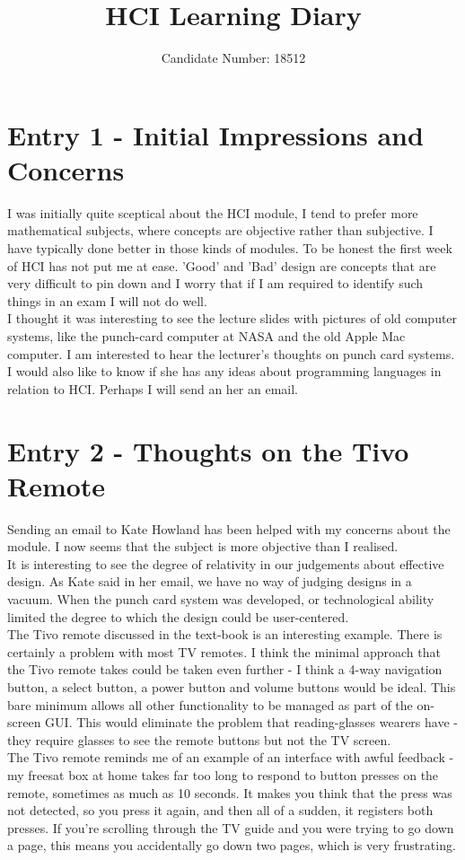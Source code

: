 \documentclass{article}
\title{HCI Learning Diary}
\author{Candidate Number: 18512}
\begin{document}
\maketitle
\section*{Entry 1 - Initial Impressions and Concerns}

\noindent I was initially quite sceptical about the HCI module, I tend to prefer more mathematical subjects, where concepts are objective rather than subjective. I have typically done better in those kinds of modules. To be honest the first week of HCI has not put me at ease. 'Good' and 'Bad' design are concepts that are very difficult to pin down and I worry that if I am required to identify such things in an exam I will not do well.
\\\indent I thought it was interesting to see the lecture slides with pictures of old computer systems, like the punch-card computer at NASA and the old Apple Mac computer. I am interested to hear the lecturer's thoughts on punch card systems. I would also like to know if she has any ideas about programming languages in relation to HCI. Perhaps I will send an her an email.

\section*{Entry 2 - Thoughts on the Tivo Remote}

\noindent Sending an email to Kate Howland has been helped with my concerns about the module. I now seems that the subject is more objective than I realised.
\\\indent It is interesting to see the degree of relativity in our judgements about effective design. As Kate said in her email, we have no way of judging designs in a vacuum. When the punch card system was developed, or technological ability limited the degree to which the design could be user-centered.
\\\indent The Tivo remote discussed in the text-book is an interesting example. There is certainly a problem with most TV remotes. I think the minimal approach that the Tivo remote takes could be taken even further - I think a 4-way navigation button, a select button, a power button and volume buttons would be ideal. This bare minimum allows all other functionality to be managed as part of the on-screen GUI. This would eliminate the problem that reading-glasses wearers have - they require glasses to see the remote buttons but not the TV screen.
\\\indent The Tivo remote reminds me of an example of an interface with awful feedback - my freesat box at home takes far too long to respond to button presses on the remote, sometimes as much as 10 seconds. It makes you think that the press was not detected, so you press it again, and then all of a sudden, it registers both presses. If you're scrolling through the TV guide and you were trying to go down a page, this means you accidentally go down two pages, which is very frustrating.
\end{document}
